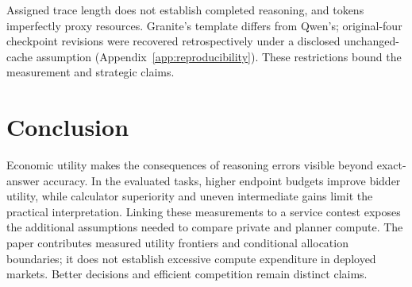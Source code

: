 \documentclass{article}
\begin{document}
Assigned trace length does not establish completed reasoning, and tokens imperfectly proxy resources. Granite's template differs from Qwen's; original-four checkpoint revisions were recovered retrospectively under a disclosed unchanged-cache assumption (Appendix~\ref{app:reproducibility}). These restrictions bound the measurement and strategic claims.

\section{Conclusion}

Economic utility makes the consequences of reasoning errors visible beyond exact-answer accuracy. In the evaluated tasks, higher endpoint budgets improve bidder utility, while calculator superiority and uneven intermediate gains limit the practical interpretation. Linking these measurements to a service contest exposes the additional assumptions needed to compare private and planner compute. The paper contributes measured utility frontiers and conditional allocation boundaries; it does not establish excessive compute expenditure in deployed markets. Better decisions and efficient competition remain distinct claims.




\clearpage
\appendix
\raggedbottom
\end{document}
